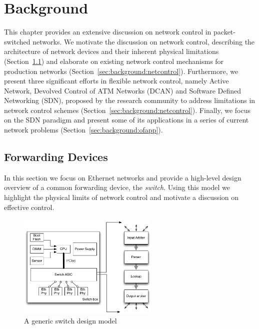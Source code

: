 \chapter{Background} \label{ch:background}

This chapter provides an extensive discussion on network control in
packet-switched networks.  We motivate the discussion on network control,
describing the architecture of network devices and their inherent physical
limitations (Section~\ref{sec:background:forwarding}) and elaborate on existing
network control mechanisms for production networks
(Section~\ref{sec:background:netcontrol}).  Furthermore, we present three
significant efforts in flexible network control, namely Active Network,
Devolved Control of ATM Networks (DCAN) and Software Defined Networking (SDN),
proposed by the research community to address limitations in network control
schemes (Section~\ref{sec:background:netcontrol}). Finally, we focus on the SDN
paradigm and present some of its applications in a series of current network
problems (Section~\ref{sec:background:ofapp}).

\section{Forwarding Devices} \label{sec:background:forwarding}

In this section we focus on Ethernet networks and provide a high-level design
overview of a common forwarding device, the \emph{switch}. Using this model we
highlight the physical limits of network control and motivate a discussion on
effective control. 

\begin{figure}
  \centering
\includegraphics[width=0.6\textwidth]{Background/BackgroundFigs/switch_design}
\caption{A generic switch design model}
\label{fig:background:switch_design}
\end{figure}

